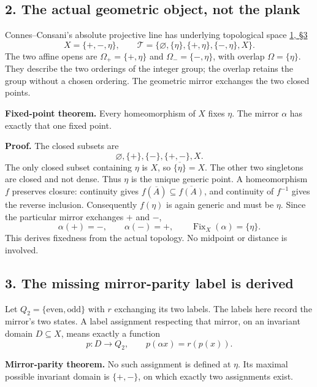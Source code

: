 \documentclass[
]{article}
\begin{document}
\subsection{2. The actual geometric object, not the
plank}\label{the-actual-geometric-object-not-the-plank}

Connes--Consani's absolute projective line has underlying topological
space \href{https://arxiv.org/html/2609.00299v1\#S3}{1, §3} \[
X=\{+,-,\eta\},\qquad
\mathcal T=\{\varnothing,\{\eta\},\{+,\eta\},\{-,\eta\},X\}.
\] The two affine opens are \(\Omega_+=\{+,\eta\}\) and
\(\Omega_-=\{-,\eta\}\), with overlap \(\Omega=\{\eta\}\). They describe
the two orderings of the integer group; the overlap retains the group
without a chosen ordering. The geometric mirror exchanges the two closed
points.

\textbf{Fixed-point theorem.} Every homeomorphism of \(X\) fixes
\(\eta\). The mirror \(\alpha\) has exactly that one fixed point.

\textbf{Proof.} The closed subsets are \[
\varnothing,\{+\},\{-\},\{+,-\},X.
\] The only closed subset containing \(\eta\) is \(X\), so
\(\overline{\{\eta\}}=X\). The other two singletons are closed and not
dense. Thus \(\eta\) is the unique generic point. A homeomorphism \(f\)
preserves closure: continuity gives
\(f(\overline A)\subseteq\overline{f(A)}\), and continuity of \(f^{-1}\)
gives the reverse inclusion. Consequently \(f(\eta)\) is again generic
and must be \(\eta\). Since the particular mirror exchanges \(+\) and
\(-\), \[
\alpha(+)=-,\qquad\alpha(-)=+,\qquad
\operatorname{Fix}_X(\alpha)=\{\eta\}.
\] This derives fixedness from the actual topology. No midpoint or
distance is involved.

\subsection{3. The missing mirror-parity label is
derived}\label{the-missing-mirror-parity-label-is-derived}

Let \(Q_2=\{\mathrm{even},\mathrm{odd}\}\) with \(r\) exchanging its two
labels. The labels here record the mirror's two states. A label
assignment respecting that mirror, on an invariant domain
\(D\subseteq X\), means exactly a function \[
p:D\longrightarrow Q_2,
\qquad p(\alpha x)=r(p(x)).
\]

\textbf{Mirror-parity theorem.} No such assignment is defined at
\(\eta\). Its maximal possible invariant domain is \(\{+,-\}\), on which
exactly two assignments exist.
\end{document}
